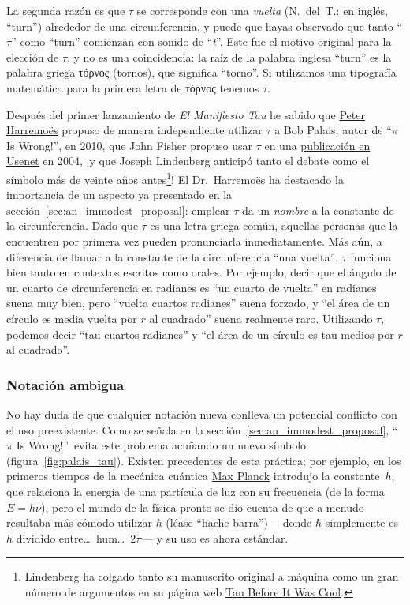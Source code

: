 La segunda razón es que $\tau$ se corresponde con una \emph{vuelta} (N.~del~T.: en inglés, ``turn'') alrededor de una circunferencia, y puede que hayas observado que tanto ``$\tau$'' como ``turn'' comienzan con sonido de ``\emph{t}''. Este fue el motivo original para la elección de $\tau$, y no es una coincidencia: la raíz de la palabra inglesa ``turn'' es la palabra griega τόρνος (tornos), que significa ``torno''. Si utilizamos una tipografía matemática para la primera letra de τόρνος tenemos $\tau$.

Después del primer lanzamiento de \emph{El Manifiesto Tau} he sabido que \href{http://www.harremoes.dk/Peter/}{Peter Harremo\"{e}s} propuso de manera independiente utilizar $\tau$ a Bob Palais, autor de ``$\pi$ Is Wrong!'', en 2010, que John Fisher propuso usar $\tau$ en una \href{https://groups.google.com/forum/#!msg/sci.math/c-DHmJHSA0A/sLCoOtHB1UAJ}{publicación en Usenet} en 2004, ¡y que Joseph Lindenberg anticipó tanto el debate como el símbolo más de veinte años antes\footnote{Lindenberg ha colgado tanto su manuscrito original a máquina como un gran número de argumentos en su página web \href{http://sites.google.com/site/taubeforeitwascool/}{Tau Before It Was Cool}.}! El Dr.~Harremo\"{e}s ha destacado la importancia de un aspecto ya presentado en la sección~\ref{sec:an_immodest_proposal}: emplear $\tau$ da un \emph{nombre} a la constante de la circunferencia. Dado que $\tau$ es una letra griega común, aquellas personas que la encuentren por primera vez pueden pronunciarla inmediatamente. Más aún, a diferencia de llamar a la constante de la circunferencia ``una vuelta'', $\tau$ funciona bien tanto en contextos escritos como orales. Por ejemplo, decir que el ángulo de un cuarto de circunferencia en radianes es ``un cuarto de vuelta'' en radianes suena muy bien, pero ``vuelta cuartos radianes'' suena forzado, y ``el área de un círculo es media vuelta por $r$ al cuadrado'' suena realmente raro. Utilizando $\tau$, podemos decir ``tau cuartos radianes'' y ``el área de un círculo es tau medios por $r$ al cuadrado''.

    \subsubsection{Notación ambigua} %
    \label{sec:ambiguous_notation}

No hay duda de que cualquier notación nueva conlleva un potencial conflicto con el uso preexistente. Como se señala en la sección~\ref{sec:an_immodest_proposal}, ``$\pi$ Is Wrong!''\ evita este problema acuñando un nuevo símbolo (figura~\ref{fig:palais_tau}). Existen precedentes de esta práctica; por ejemplo, en los primeros tiempos de la mecánica cuántica \href{https://es.wikipedia.org/wiki/Max_Planck}{Max Planck} introdujo la constante~$h$, que relaciona la energía de una partícula de luz con su frecuencia (de la forma $E = h\nu$), pero el mundo de la física pronto se dio cuenta de que a menudo resultaba más cómodo utilizar $\hbar$ (léase ``hache barra'') ---donde $\hbar$ simplemente es $h$ dividido entre\ldots\ hum\ldots\ $2\pi$--- y su uso es ahora estándar. 

